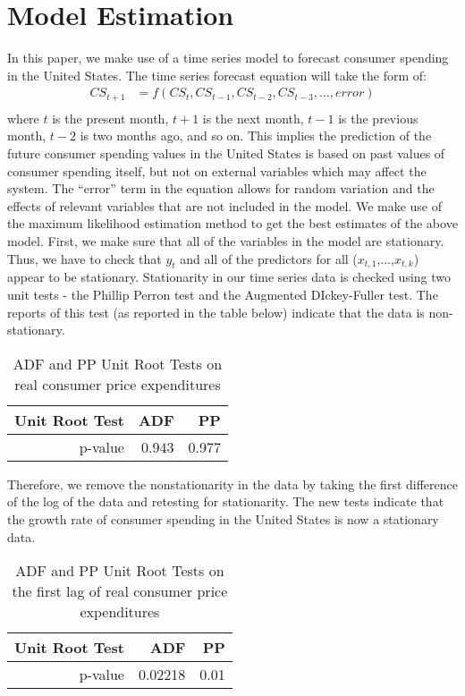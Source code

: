 \documentclass[12pt]{article}
\newcommand{\newpar}{\vspace{0.15in} \noindent}
\begin{document}
\section{Model Estimation}
In this paper, we make use of a time series model to forecast consumer spending in the United States. The time series forecast equation will take the form of:
\begin{equation} 
\begin{split}
CS_{t+1} & = f(CS_{t},CS_{t-1},CS_{t-2}, CS_{t-3},..., error ) \\
\end{split}
\end{equation}
\newline
where $t$ is the present month, $t+1$ is the next month, $t-1$ is the previous month, $t-2$ is two months ago, and so on. This implies the  prediction of the future consumer spending values in the United States is based on past values of consumer spending itself, but not on external variables which may affect the system. The “error” term in the equation allows for random variation and the effects of relevant variables that are not included in the model.
\newpar
\newline
We make use of the maximum likelihood estimation method to get the best estimates of the above model. First, we make sure that all of the variables in the model are stationary. Thus, we have to check that $y_t$ and all of the predictors for all ($x_{t,1}$,...,$x_{t,k}$) appear to be stationary. Stationarity in our time series data is checked using two unit tests - the Phillip Perron test and the Augmented DIckey-Fuller test. The reports of this test (as reported in the table below) indicate that the data is non-stationary. 
\newpar
\begin{table}[ht]
\centering
\begin{tabular}{r|r|r}
  \hline
 Unit Root Test & ADF & PP \\ 
  \hline
p-value & 0.943 & 0.977 \\
   \hline
\end{tabular}
\caption{ADF and PP Unit Root Tests on real consumer price expenditures}
\end{table}
\newpar
\newpar
\newline
Therefore, we remove the nonstationarity in the data by taking the first difference of the log of the data and retesting for stationarity. The new tests indicate that the growth rate of consumer spending in the United States is now a stationary data. 
\newpar
\newpar
\begin{table}[ht]
\centering
\begin{tabular}{r|r|r}
  \hline
 Unit Root Test & ADF & PP \\ 
  \hline
p-value & 0.02218 & 0.01\\
   \hline
\end{tabular}
\caption{ADF and PP Unit Root Tests on the first lag of real consumer price expenditures}
\end{table}
\end{document}
